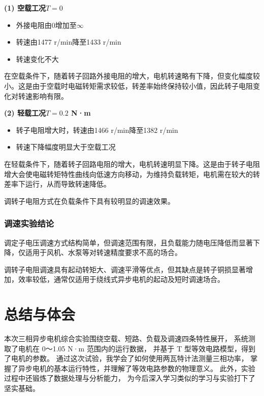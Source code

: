 \documentclass[12pt,a4paper]{article}
\begin{document}
\textbf{(1) 空载工况$T = 0$}
\begin{itemize}
\item 外接电阻由0增加至$\infty$
\item 转速由1477 r/min降至1433 r/min
\item 转速变化不大
\end{itemize}

在空载条件下，随着转子回路外接电阻的增大，电机转速略有下降，但变化幅度较小。这是由于空载时电磁转矩需求较低，转差率始终保持较小值，因此转子电阻变化对转速影响有限。

\textbf{(2) 轻载工况$T = 0.2$ N·m}
\begin{itemize}
\item 转子电阻增大时，转速由1466 r/min降至1382 r/min
\item 转速下降幅度明显大于空载工况
\end{itemize}

在轻载条件下，随着转子回路电阻的增大，电机转速明显下降。这是由于转子电阻增大会使电磁转矩特性曲线向低速方向移动，为维持负载转矩，电机需在较大的转差率下运行，从而导致转速降低。

调转子电阻方式在负载条件下具有较明显的调速效果。

\subsubsection{调速实验结论}

调定子电压调速方式结构简单，但调速范围有限，且负载能力随电压降低而显著下降，仅适用于风机、水泵等对转速精度要求不高的场合。

调转子电阻调速具有起动转矩大、调速平滑等优点，但其缺点是转子铜损显著增加，效率较低，通常仅适用于绕线式异步电机的起动及短时调速场合。

\section{总结与体会}
本次三相异步电机综合实验围绕空载、短路、负载及调速四条特性展开，
系统测取了电机在 0～1.05 N·m 范围内的运行数据，
并基于 T 型等效电路模型，得到了电机的参数。
通过这次试验，我学会了如何使用两瓦特计法测量三相功率，
掌握了异步电机的基本运行特性，并理解了等效电路参数的物理意义。
此外，实验过程中还锻炼了数据处理与分析能力，
为今后深入学习类似的学习与实验打下了坚实基础。
\end{document}
